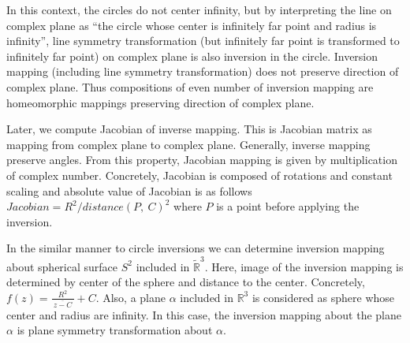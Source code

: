 In this context, the circles do not center infinity, but 
by interpreting the line on complex plane as ``the circle whose center is
infinitely far point and radius is infinity'', 
line symmetry transformation (but infinitely far point is
transformed to infinitely far point) on complex plane 
is also inversion in the circle.
Inversion mapping (including line symmetry transformation) does not
preserve direction of complex plane.
Thus compositions of even number of inversion mapping are homeomorphic
mappings preserving direction of complex plane.

Later, we compute Jacobian of inverse mapping.
This is Jacobian matrix as mapping from complex plane to complex plane.
Generally, inverse mapping preserve angles.
From this property, Jacobian mapping is given by multiplication of complex
number.
Concretely, Jacobian is composed of rotations and constant scaling
and absolute value of Jacobian is as follows
$Jacobian = R^2 / distance(P,~C)^2$
where $P$ is a point before applying the inversion.

In the similar manner to circle inversions we can determine inversion
mapping about spherical surface $S^2$ included in $\tilde{\mathbb{R}}^3$.
Here, image of the inversion mapping is determined by center of the sphere and
distance to the center.
Concretely, $f(z) = \frac{R^2}{~\overline{z -C}~} + C$.
Also, a plane $\alpha$ included in $\mathbb{R}^3$ is considered as
sphere whose center and radius are infinity.
In this case, the inversion mapping about the plane $\alpha$ is plane symmetry
transformation about $\alpha$.

